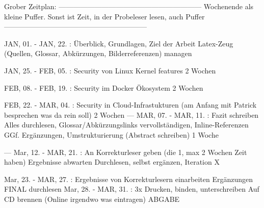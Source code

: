 Grober Zeitplan:
------------------------------------------------------------
Wochenende als kleine Puffer.
Sonst ist Zeit, in der Probeleser lesen, auch Puffer
------------------------------------------------------------

JAN, 01. - JAN, 22. : Überblick, Grundlagen, Ziel der Arbeit
                      Latex-Zeug (Quellen, Glossar, Abkürzungen, Bilderreferenzen) managen

JAN, 25. - FEB, 05. : Security von Linux Kernel features
                      2 Wochen

FEB, 08. - FEB, 19. : Security im Docker Ökosystem
                      2 Wochen

FEB, 22. - MAR, 04. : Security in Cloud-Infrastukturen (am Anfang mit Patrick besprechen was da rein soll)
                      2 Wochen
---
MAR, 07. - MAR, 11. : Fazit schreiben
                      Alles durchlesen, Glossar/Abkürzungslinks vervollständigen, Inline-Referenzen
                      GGf. Ergänzungen, Umstrukturierung
                      (Abstract schreiben)
                      1 Woche

---
Mar, 12. - MAR, 21. : An Korrekturleser geben (die 1, max 2 Wochen Zeit haben)
                      Ergebnisse abwarten
                      Durchlesen, selbst ergänzen, Iteration X

Mar, 23. - MAR, 27. : Ergebnisse von Korrekturlesern einarbeiten
                      Ergänzungen
                      FINAL durchlesen
Mar, 28. - MAR, 31. : 3x Drucken, binden, unterschreiben
                      Auf CD brennen
                      (Online irgendwo was eintragen)
                      ABGABE
